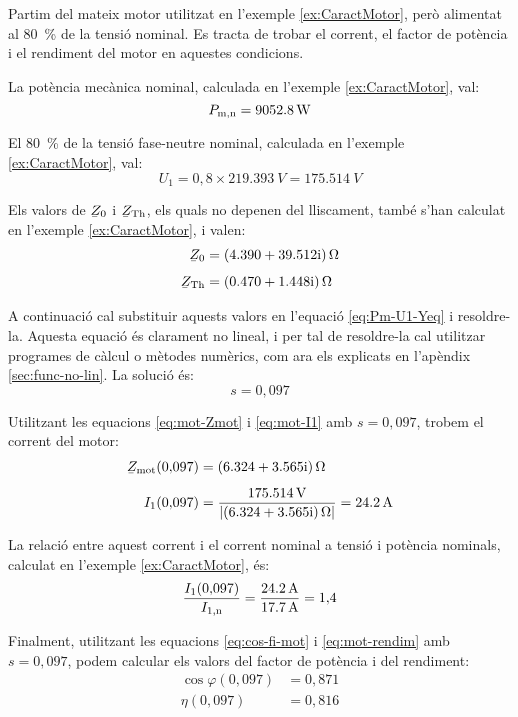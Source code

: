 	
\begin{exemple}\label{ex:MotTensRedSolAp}
	\addcontentsxms{\MotTensRedSolAp}	
	Partim del mateix motor utilitzat en l'exemple \vref{ex:CaractMotor}, però alimentat al \qty{80}{\%} de la tensió nominal. Es tracta de trobar el corrent, el factor de potència i el rendiment del motor en aquestes condicions.
	
	La potència mecànica nominal, calculada  en l'exemple \ref{ex:CaractMotor}, val: \[
	P_\mathrm{m,n} = \qty{9052,8}{W}
	\]
	
	El \qty{80}{\%} de la tensió fase-neutre nominal, calculada  en l'exemple \ref{ex:CaractMotor}, val:
	\[
	U_1 = 0{,}8\times\qty{219,393}{V} = \qty{175,514}{V}
	\]
	
	Els valors de $\cmplx{Z}_0$ i  $\cmplx{Z}\ped{Th}$, els quals no depenen del lliscament, també s'han calculat en  l'exemple \ref{ex:CaractMotor}, i valen:
	\begin{align*}
	\cmplx{Z}_0 &=  \complexqty{4,390+j39,512}{\ohm} \\[1ex]
	\cmplx{Z}\ped{Th} &= \complexqty{0,470+j1,448}{\ohm} 
	\end{align*}
	
	A continuació cal substituir aquests valors en l'equació \eqref{eq:Pm-U1-Yeq} i resoldre-la. Aquesta equació és clarament no lineal, i per tal de resoldre-la cal utilitzar programes de càlcul o mètodes numèrics, com ara els explicats en l'apèndix \ref{sec:func-no-lin}. La solució és:
	\[
	s = 0{,}097
	\]
	
	Utilitzant les equacions \eqref{eq:mot-Zmot} i \eqref{eq:mot-I1} amb $s  = 0{,}097$, trobem el corrent del motor:
	\begin{align*}
	\cmplx{Z}\ped{mot}(0{,}097) &=  \complexqty{6,324+j3,565}{\ohm} \\[1ex]
	I_1(0{,}097) &= \frac{\qty{175,514}{V}}{|\complexqty{6,324+j3,565}{\ohm}|} = \qty{24,2}{A}
	\end{align*}
	
	La relació entre aquest  corrent i el corrent nominal a tensió i potència nominals, calculat en l'exemple \ref{ex:CaractMotor}, és:
	\[
	\frac{I_1(0{,}097)}{I_\mathrm{1,n}} = \frac{\qty{24,2}{A}}{\qty{17,7}{A}} = 1{,}4
	\]
	
	Finalment, utilitzant les equacions  \eqref{eq:cos-fi-mot} i \eqref{eq:mot-rendim} amb $s  = 0{,}097$, podem calcular els valors del factor de potència i del rendiment:
	\begin{align*}
	\cos\varphi(0{,}097) &=  0{,}871 \\
	\eta(0{,}097) &=  0{,}816
	\end{align*}
	

\end{exemple}
